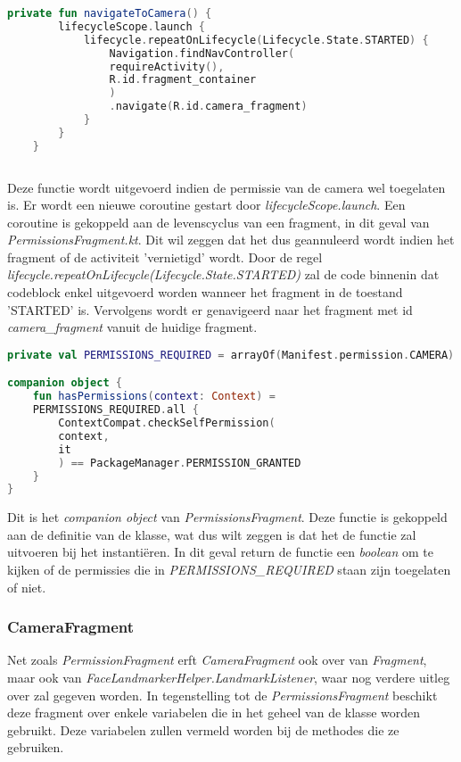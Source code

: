 \begin{lstlisting}[language=Kotlin, caption=navigateToCamera() in PermissionsFragment.kt]
    private fun navigateToCamera() {
        lifecycleScope.launch {
            lifecycle.repeatOnLifecycle(Lifecycle.State.STARTED) {
                Navigation.findNavController(
                requireActivity(),
                R.id.fragment_container
                )
                .navigate(R.id.camera_fragment)
            }
        }
    }
    
\end{lstlisting}
Deze functie wordt uitgevoerd indien de permissie van de camera wel toegelaten is. Er wordt een nieuwe coroutine gestart door \emph{lifecycleScope.launch}. Een coroutine is gekoppeld aan de levenscyclus van een fragment, in dit geval van \emph{PermissionsFragment.kt}. Dit wil zeggen dat het dus geannuleerd wordt indien het fragment of de activiteit 'vernietigd' wordt. Door de regel \emph{lifecycle.repeatOnLifecycle(Lifecycle.State.STARTED)} zal de code binnenin dat codeblock enkel uitgevoerd worden wanneer het fragment in de toestand 'STARTED' is. Vervolgens wordt er genavigeerd naar het fragment met id \emph{camera\_fragment} vanuit de huidige fragment.

\begin{lstlisting}[language=Kotlin, caption=companion object van PermissionsFragment.kt]
private val PERMISSIONS_REQUIRED = arrayOf(Manifest.permission.CAMERA)

companion object {
    fun hasPermissions(context: Context) =
    PERMISSIONS_REQUIRED.all {
        ContextCompat.checkSelfPermission(
        context,
        it
        ) == PackageManager.PERMISSION_GRANTED
    }
}
\end{lstlisting}
Dit is het \emph{companion object} van \emph{PermissionsFragment}. Deze functie is gekoppeld aan de definitie van de klasse, wat dus wilt zeggen is dat het de functie zal uitvoeren bij het instantiëren. In dit geval return de functie een \emph{boolean} om te kijken of de permissies die in \emph{PERMISSIONS\_REQUIRED} staan zijn toegelaten of niet.

\subsubsection{CameraFragment}
Net zoals \emph{PermissionFragment} erft \emph{CameraFragment} ook over van \emph{Fragment}, maar ook van \emph{FaceLandmarkerHelper.LandmarkListener}, waar nog verdere uitleg over zal gegeven worden.
In tegenstelling tot de \emph{PermissionsFragment} beschikt deze fragment over enkele variabelen die in het geheel van de klasse worden gebruikt. Deze variabelen zullen vermeld worden bij de methodes die ze gebruiken.

